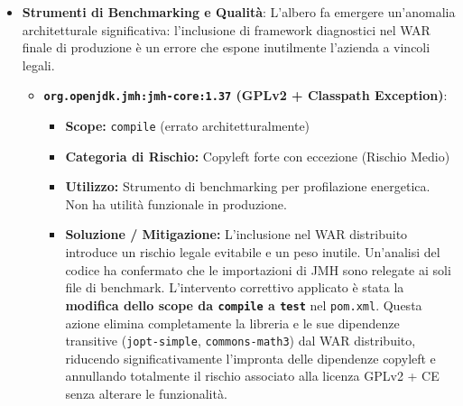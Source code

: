 \begin{itemize}
\begin{itemize}
        \item \textbf{\texttt{org.mockito:mockito-core} e dipendenze transitive (MIT / Apache 2.0)}:
        \begin{itemize}
            \item \textbf{Scope:} \texttt{test}
            \item \textbf{Categoria di Rischio:} Licenze permissive (Rischio Nullo)
            \item \textbf{Utilizzo:} Strumenti di mocking (incluso \texttt{byte-buddy}) per l'isolamento dei test.
            \item \textbf{Soluzione / Mitigazione:} Componenti totalmente sicuri, resi ininfluenti sul WAR finale grazie allo scope di test. Nessun intervento necessario.
        \end{itemize}
    \end{itemize}
    
    \item \textbf{Strumenti di Benchmarking e Qualità}:
    L'albero fa emergere un'anomalia architetturale significativa: l'inclusione di framework diagnostici nel WAR finale di produzione è un errore che espone inutilmente l'azienda a vincoli legali.
    \begin{itemize}
        \item \textbf{\texttt{org.openjdk.jmh:jmh-core:1.37} (GPLv2 + Classpath Exception)}:
        \begin{itemize}
            \item \textbf{Scope:} \texttt{compile} (errato architetturalmente)
            \item \textbf{Categoria di Rischio:} Copyleft forte con eccezione (Rischio Medio)
            \item \textbf{Utilizzo:} Strumento di benchmarking per profilazione energetica. Non ha utilità funzionale in produzione.
            \item \textbf{Soluzione / Mitigazione:} L'inclusione nel WAR distribuito introduce un rischio legale evitabile e un peso inutile. Un'analisi del codice ha confermato che le importazioni di JMH sono relegate ai soli file di benchmark. L'intervento correttivo applicato è stata la \textbf{modifica dello scope da \texttt{compile} a \texttt{test}} nel \texttt{pom.xml}. Questa azione elimina completamente la libreria e le sue dipendenze transitive (\texttt{jopt-simple}, \texttt{commons-math3}) dal WAR distribuito, riducendo significativamente l'impronta delle dipendenze copyleft e annullando totalmente il rischio associato alla licenza GPLv2 + CE senza alterare le funzionalità.
        \end{itemize}
        

\end{itemize}
\end{itemize}
